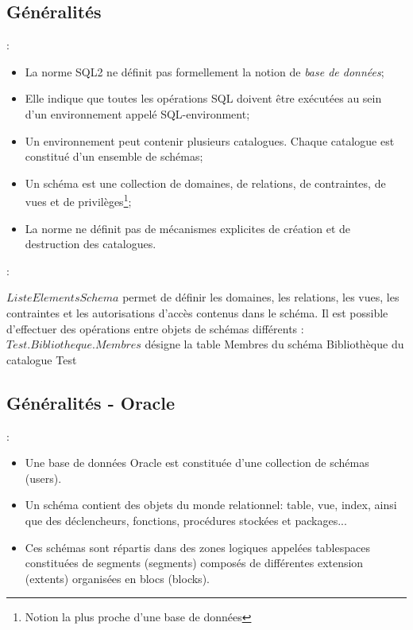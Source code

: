 \documentclass[10pt]{beamer}
\begin{document}
\subsection{Généralités}
\begin{frame}{\secname : \subsecname}
    \begin{itemize}
        \item La norme SQL2 ne définit pas formellement la notion de \emph{base de données};
        \item Elle indique que toutes les opérations SQL doivent être exécutées au sein d'un environnement appelé SQL-environment;
        \item Un environnement peut contenir plusieurs catalogues. Chaque catalogue est constitué d'un ensemble de schémas;
        \item Un schéma est une collection de domaines, de relations, de contraintes, de vues et de privilèges\footnote{Notion la plus proche d'une base de données};
        \item La norme ne définit pas de mécanismes explicites de création et de destruction des catalogues.
    \end{itemize}
\end{frame}

\begin{frame}{\secname : \subsecname}
    
    $ListeElementsSchema$ permet de définir les domaines, les relations, les vues, les contraintes et les autorisations d'accès contenus dans le schéma.
    Il est possible d'effectuer des opérations entre objets de schémas différents :
    $Test.Bibliotheque.Membres$ désigne la table Membres du schéma Bibliothèque du catalogue Test
\end{frame}

\subsection{Généralités - Oracle}
\begin{frame}{\secname : \subsecname}
    \begin{itemize}
        \item Une base de données Oracle est constituée d'une collection de schémas (users).
        \item Un schéma contient des objets du monde relationnel: table, vue, index, ainsi que des déclencheurs, fonctions, procédures stockées et packages...
        \item Ces schémas sont répartis dans des zones logiques appelées tablespaces constituées de segments (segments) composés de différentes extension (extents) organisées en blocs (blocks).
    \end{itemize}
\end{frame}
\end{document}
